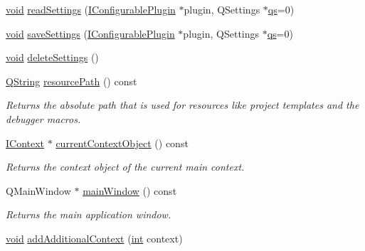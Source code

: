 \begin{DoxyCompactItemize}
\item 
\hyperlink{group___u_a_v_objects_plugin_ga444cf2ff3f0ecbe028adce838d373f5c}{void} \hyperlink{group___core_plugin_ga9001320c2014e97ce6eb7d671e848b7e}{read\-Settings} (\hyperlink{class_core_1_1_i_configurable_plugin}{I\-Configurable\-Plugin} $\ast$plugin, Q\-Settings $\ast$\hyperlink{analyze_i_n_s_g_p_s_8m_a620a138c8981e0536c569d7761df4548}{qs}=0)
\item 
\hyperlink{group___u_a_v_objects_plugin_ga444cf2ff3f0ecbe028adce838d373f5c}{void} \hyperlink{group___core_plugin_gacf3a05b02646c405db2d558e6be9dcc7}{save\-Settings} (\hyperlink{class_core_1_1_i_configurable_plugin}{I\-Configurable\-Plugin} $\ast$plugin, Q\-Settings $\ast$\hyperlink{analyze_i_n_s_g_p_s_8m_a620a138c8981e0536c569d7761df4548}{qs}=0)
\item 
\hyperlink{group___u_a_v_objects_plugin_ga444cf2ff3f0ecbe028adce838d373f5c}{void} \hyperlink{group___core_plugin_ga5b7459370fa3bbf7ce640daeb6fc24bf}{delete\-Settings} ()
\item 
\hyperlink{group___u_a_v_objects_plugin_gab9d252f49c333c94a72f97ce3105a32d}{Q\-String} \hyperlink{group___core_plugin_gaec002f1acc867600ed77ab14b6deb37d}{resource\-Path} () const 
\begin{DoxyCompactList}\small\item\em Returns the absolute path that is used for resources like project templates and the debugger macros. \end{DoxyCompactList}\item 
\hyperlink{class_core_1_1_i_context}{I\-Context} $\ast$ \hyperlink{group___core_plugin_ga8216933cd5d2cfa42d5769b653dbeac6}{current\-Context\-Object} () const 
\begin{DoxyCompactList}\small\item\em Returns the context object of the current main context. \end{DoxyCompactList}\item 
Q\-Main\-Window $\ast$ \hyperlink{group___core_plugin_gad583b7ea7f5c09f09ec4a779616c05d9}{main\-Window} () const 
\begin{DoxyCompactList}\small\item\em Returns the main application window. \end{DoxyCompactList}\item 
\hyperlink{group___u_a_v_objects_plugin_ga444cf2ff3f0ecbe028adce838d373f5c}{void} \hyperlink{group___core_plugin_ga94cc910efec0c3aa04bd218699c7fbac}{add\-Additional\-Context} (\hyperlink{ioapi_8h_a787fa3cf048117ba7123753c1e74fcd6}{int} context)

\end{DoxyCompactItemize}
